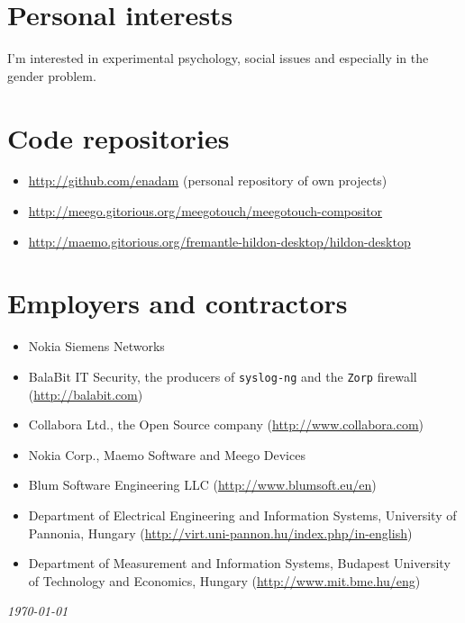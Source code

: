 \documentclass[a4paper,12pt]{article}
\newcommand{\compress}{\setlength\itemsep{-\parskip}}
\begin{document}
\section{Personal interests}

I'm interested in experimental psychology, social issues and especially
in the gender problem.

\section{Code repositories}

\begin{itemize}\compress
\item	\url{http://github.com/enadam} (personal repository of own projects)
\item	\url{http://meego.gitorious.org/meegotouch/meegotouch-compositor}
\item	\url{http://maemo.gitorious.org/fremantle-hildon-desktop/hildon-desktop}
\end{itemize}

\section{Employers and contractors}

\begin{itemize}\compress
\item	Nokia Siemens Networks
\item	BalaBit IT Security, the producers of \texttt{syslog-ng}
	and the \texttt{Zorp} firewall (\url{http://balabit.com})
\item	Collabora Ltd., the Open Source company (\url{http://www.collabora.com})
\item	Nokia Corp., Maemo Software and Meego Devices
\item	Blum Software Engineering LLC (\url{http://www.blumsoft.eu/en})
\item	Department of Electrical Engineering and Information Systems,
	University of Pannonia, Hungary
	(\url{http://virt.uni-pannon.hu/index.php/in-english})
\item	Department of Measurement and Information Systems,
	Budapest University of Technology and Economics, Hungary
	(\url{http://www.mit.bme.hu/eng})
\end{itemize}

\center\itshape\today
\end{document}
